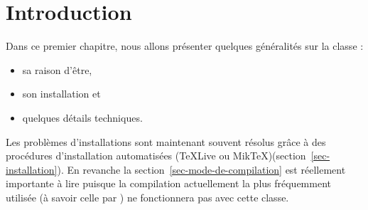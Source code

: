 \documentclass[nocrop]{sesamanuel}
\begin{document}
\setcounter{chapter}{0}
\chapter{Introduction}\label{chIntro}
\begin{prerequis}Dans ce premier chapitre, nous allons présenter quelques généralités
  sur la classe  :
\begin{itemize}
\item   sa raison d'être,
\item son installation
  et 
  \item quelques détails techniques.
\end{itemize}
  Les problèmes d'installations sont maintenant souvent résolus
  grâce à des procédures d'installation automatisées (\TeX Live ou
  Mik\TeX)(section~\ref{sec-installation}). 
  \vfill \columnbreak
  En revanche la
  section~\ref{sec-mode-de-compilation} est réellement importante
  à lire puisque la compilation actuellement la plus fréquemment
  utilisée (à savoir celle par ) ne fonctionnera pas
  avec cette classe.
\end{prerequis}
\end{document}
